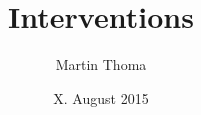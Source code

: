 \documentclass{beamer}
\begin{document}
\title{Interventions}
\author{Martin Thoma}
\date{X. August 2015}
\subject{Causality}

\frame{\titlepage}






\end{document}
